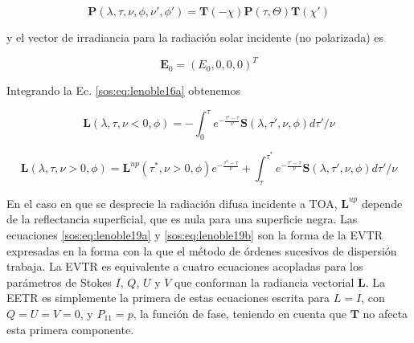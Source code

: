         \begin{equation}
         \textbf{P}(\lambda,\tau,\nu,\phi,\nu',\phi')=\textbf{T}(-\chi)\textbf{P}(\tau,\Theta)\textbf{T}(\chi')
        \label{sos:eq:lenoble17}
         \end{equation}
        
        \noindent y el vector de irradiancia para la radiación solar incidente (no polarizada) es
        
        \begin{equation}
        \textbf{E}_{0}=(E_{0},0,0,0)^{T}
        \label{sos:eq:lenoble18}
        \end{equation}
        
        Integrando la Ec. \ref{sos:eq:lenoble16a} obtenemos
        
        \begin{equation}
        \textbf{L}(\lambda,\tau,\nu<0,\phi) = 
        -\int_{0}^{\tau}e^{-\frac{\tau'-\tau}{\nu}}\textbf{S}(\lambda,\tau', 
        \nu,\phi)d\tau'/\nu
        \label{sos:eq:lenoble19a}
        \end{equation}
        
        \begin{equation}
        \textbf{L}(\lambda,\tau,\nu>0,\phi)= 
        \textbf{L}^{up}(\tau^{*},\nu>0,\phi)e^{-\frac{\tau^{*}-\tau}{\nu}}+\int_{\tau}^{\tau^
        {*}}e^{-\frac{\tau'-\tau}{\nu}}\textbf{S}(\lambda,\tau', \nu, \phi)d\tau'/\nu
        \label{sos:eq:lenoble19b}
        \end{equation}
        
        En el caso en que se desprecie la radiación difusa incidente a TOA, $\textbf{L}^{up}$ depende de la reflectancia superficial, que es nula para una superficie negra. Las ecuaciones \ref{sos:eq:lenoble19a} y \ref{sos:eq:lenoble19b} son la forma de la EVTR expresadas en la forma con la que el método de órdenes sucesivos de dispersión trabaja. La EVTR es equivalente a cuatro ecuaciones acopladas para los parámetros de Stokes $I$, $Q$, $U$ y $V$ que conforman la radiancia vectorial $\textbf{L}$. La EETR es simplemente la primera de estas ecuaciones  escrita para $L=I$, con $Q=U=V=0$, y $P_{11}=p$, la función de fase, teniendo en cuenta que $\textbf{T}$ no afecta esta primera componente.

